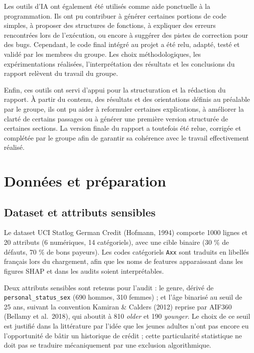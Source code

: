 \documentclass[11pt, a4paper]{article}
\begin{document}
Les outils d'IA ont également été utilisés comme aide ponctuelle à la programmation. Ils ont pu contribuer à générer certaines portions de code simples, à proposer des structures de fonctions, à expliquer des erreurs rencontrées lors de l'exécution, ou encore à suggérer des pistes de correction pour des bugs. Cependant, le code final intégré au projet a été relu, adapté, testé et validé par les membres du groupe. Les choix méthodologiques, les expérimentations réalisées, l'interprétation des résultats et les conclusions du rapport relèvent du travail du groupe.

Enfin, ces outils ont servi d'appui pour la structuration et la rédaction du rapport. À partir du contenu, des résultats et des orientations définis au préalable par le groupe, ils ont pu aider à reformuler certaines explications, à améliorer la clarté de certains passages ou à générer une première version structurée de certaines sections. La version finale du rapport a toutefois été relue, corrigée et complétée par le groupe afin de garantir sa cohérence avec le travail effectivement réalisé.

\tableofcontents
\vspace{1em}

\section{Données et préparation}

\subsection{Dataset et attributs sensibles}

Le dataset UCI Statlog German Credit (Hofmann, 1994) comporte 1000 lignes et 20 attributs (6 numériques, 14 catégoriels), avec une cible binaire (30 \% de défauts, 70 \% de bons payeurs). Les codes catégoriels \texttt{Axx} sont traduits en libellés français lors du chargement, afin que les noms de features apparaissant dans les figures SHAP et dans les audits soient interprétables.

Deux attributs sensibles sont retenus pour l'audit : le genre, dérivé de \texttt{personal\_status\_sex} (690 hommes, 310 femmes) ; et l'âge binarisé au seuil de 25 ans, suivant la convention Kamiran \& Calders (2012) reprise par AIF360 (Bellamy et al.\ 2018), qui aboutit à 810 \emph{older} et 190 \emph{younger}. Le choix de ce seuil est justifié dans la littérature par l'idée que les jeunes adultes n'ont pas encore eu l'opportunité de bâtir un historique de crédit ; cette particularité statistique ne doit pas se traduire mécaniquement par une exclusion algorithmique.
\end{document}
